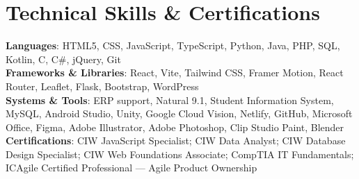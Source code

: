 \documentclass[letterpaper,11pt]{article}
\begin{document}
\section{Technical Skills \& Certifications}
 \begin{itemize}[leftmargin=0.15in, label={}]
    \small{\item{
     \textbf{Languages}{: HTML5, CSS, JavaScript, TypeScript, Python, Java, PHP, SQL, Kotlin, C, C\#, jQuery, Git} \\
     \textbf{Frameworks \& Libraries}{: React, Vite, Tailwind CSS, Framer Motion, React Router, Leaflet, Flask, Bootstrap, WordPress} \\
     \textbf{Systems \& Tools}{: ERP support, Natural 9.1, Student Information System, MySQL, Android Studio, Unity, Google Cloud Vision, Netlify, GitHub, Microsoft Office, Figma, Adobe Illustrator, Adobe Photoshop, Clip Studio Paint, Blender} \\
     \textbf{Certifications}{: CIW JavaScript Specialist; CIW Data Analyst; CIW Database Design Specialist; CIW Web Foundations Associate; CompTIA IT Fundamentals; ICAgile Certified Professional --- Agile Product Ownership}
    }}
 \end{itemize}
\end{document}
